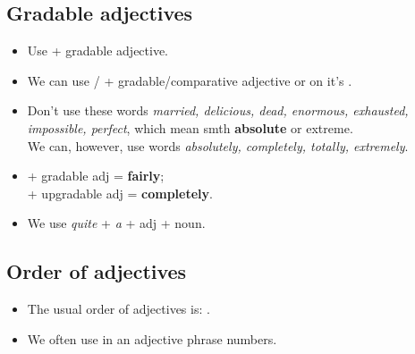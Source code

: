 \subsection{Gradable adjectives}
\begin{itemize}
    \item Use  + gradable adjective.
    \item We can use  /  + gradable/comparative adjective or on it's .
    \item[\doot] Don't use these words 
    \textit{married, delicious, dead, enormous, exhausted, impossible, perfect},%
    which mean smth \textbf{absolute} or extreme.
    \\We can, however, use words  \textit{absolutely, completely, totally, extremely}.
    \item[\doot]  + gradable adj = \textbf{fairly};\\
     + upgradable adj = \textbf{completely}.
    \item[\aast] We use \textit{quite} + \textit{a} + adj + noun.
\end{itemize}

\subsection{Order of adjectives}
\begin{itemize}
    \item The usual order of adjectives is: .
    \item We often use  in an adjective phrase  numbers.
\end{itemize}

